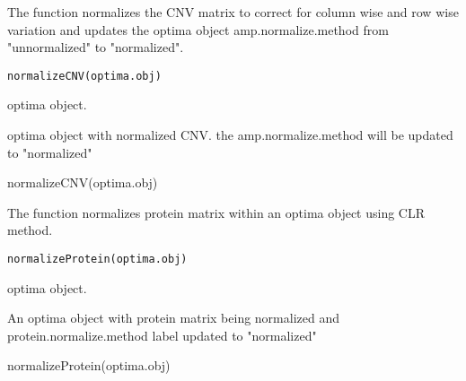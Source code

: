 \documentclass[a4paper]{book}
\begin{document}
%
\begin{Description}\relax
The function normalizes the CNV matrix to correct for column wise and row wise variation and
updates the optima object amp.normalize.method from "unnormalized" to "normalized".
\end{Description}
%
\begin{Usage}
\begin{verbatim}
normalizeCNV(optima.obj)
\end{verbatim}
\end{Usage}
%
\begin{Arguments}
\begin{ldescription}
\item[\code{optima.obj}] optima object.
\end{ldescription}
\end{Arguments}
%
\begin{Value}
optima object with normalized CNV. the amp.normalize.method will be updated to "normalized"
\end{Value}
%
\begin{Examples}
\begin{ExampleCode}
normalizeCNV(optima.obj)
\end{ExampleCode}
\end{Examples}
%
\begin{Description}\relax
The function normalizes protein matrix within an optima object using
CLR method.
\end{Description}
%
\begin{Usage}
\begin{verbatim}
normalizeProtein(optima.obj)
\end{verbatim}
\end{Usage}
%
\begin{Arguments}
\begin{ldescription}
\item[\code{optima.obj}] optima object.
\end{ldescription}
\end{Arguments}
%
\begin{Value}
An optima object with protein matrix being normalized and
protein.normalize.method label updated to "normalized"
\end{Value}
%
\begin{Examples}
\begin{ExampleCode}
normalizeProtein(optima.obj)
\end{ExampleCode}
\end{Examples}
\end{document}
